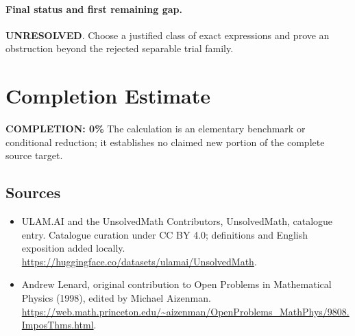 \documentclass[11pt]{article}
\begin{document}
\paragraph{Final status and first remaining gap.}
\textbf{UNRESOLVED}. Choose a justified class of exact expressions and prove an obstruction beyond the rejected separable trial family.

\section{Completion Estimate}
\noindent\textbf{COMPLETION: 0\%}
The calculation is an elementary benchmark or conditional reduction; it establishes no claimed new portion of the complete source target.

\subsection{Sources}
\begin{itemize}
\item[\hypertarget{source:statement:1}{S1}] ULAM.AI and the UnsolvedMath Contributors, UnsolvedMath, catalogue entry. Catalogue curation under CC BY 4.0; definitions and English exposition added locally.
\url{https://huggingface.co/datasets/ulamai/UnsolvedMath}.
\item[\hypertarget{source:statement:2}{S2}] Andrew Lenard, original contribution to Open Problems in Mathematical Physics (1998), edited by Michael Aizenman.
\url{https://web.math.princeton.edu/~aizenman/OpenProblems_MathPhys/9808.ImposThms.html}.
\end{itemize}
\label{end:statement}
\end{document}
